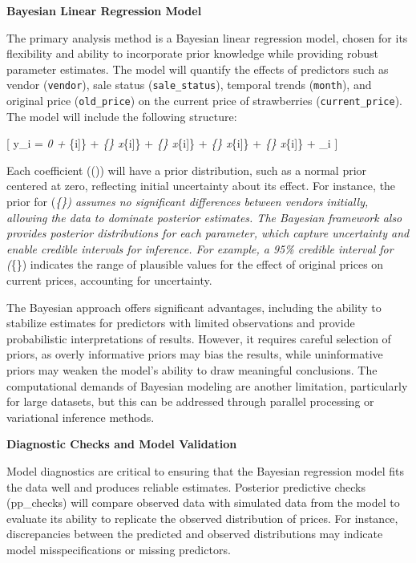 \documentclass[
  letterpaper,
  DIV=11,
  numbers=noendperiod]{scrartcl}
\begin{document}
\textbf{Bayesian Linear Regression Model}

The primary analysis method is a Bayesian linear regression model,
chosen for its flexibility and ability to incorporate prior knowledge
while providing robust parameter estimates. The model will quantify the
effects of predictors such as vendor (\texttt{vendor}), sale status
(\texttt{sale\_status}), temporal trends (\texttt{month}), and original
price (\texttt{old\_price}) on the current price of strawberries
(\texttt{current\_price}). The model will include the following
structure:

{[} y\_i = \beta\emph{0 + \beta}\{\text{vendor}{[}i{]}\} +
\beta\emph{\{\} \cdot x}\{\text{organic}{[}i{]}\} +
\beta\emph{\{\} \cdot x}\{\text{sale}{[}i{]}\} +
\beta\emph{\{\} \cdot x}\{\text{month}{[}i{]}\} +
\beta\emph{\{\} \cdot x}\{\text{old\_price}{[}i{]}\} +
\epsilon\_i {]}

Each coefficient ((\beta)) will have a prior distribution, such as a
normal prior centered at zero, reflecting initial uncertainty about its
effect. For instance, the prior for (\beta\emph{\{\})
assumes no significant differences between vendors initially, allowing
the data to dominate posterior estimates. The Bayesian framework also
provides posterior distributions for each parameter, which capture
uncertainty and enable credible intervals for inference. For example, a
95\% credible interval for (\beta}\{\}) indicates the
range of plausible values for the effect of original prices on current
prices, accounting for uncertainty.

The Bayesian approach offers significant advantages, including the
ability to stabilize estimates for predictors with limited observations
and provide probabilistic interpretations of results. However, it
requires careful selection of priors, as overly informative priors may
bias the results, while uninformative priors may weaken the model's
ability to draw meaningful conclusions. The computational demands of
Bayesian modeling are another limitation, particularly for large
datasets, but this can be addressed through parallel processing or
variational inference methods.

\textbf{Diagnostic Checks and Model Validation}

Model diagnostics are critical to ensuring that the Bayesian regression
model fits the data well and produces reliable estimates. Posterior
predictive checks (pp\_checks) will compare observed data with simulated
data from the model to evaluate its ability to replicate the observed
distribution of prices. For instance, discrepancies between the
predicted and observed distributions may indicate model
misspecifications or missing predictors.
\end{document}
